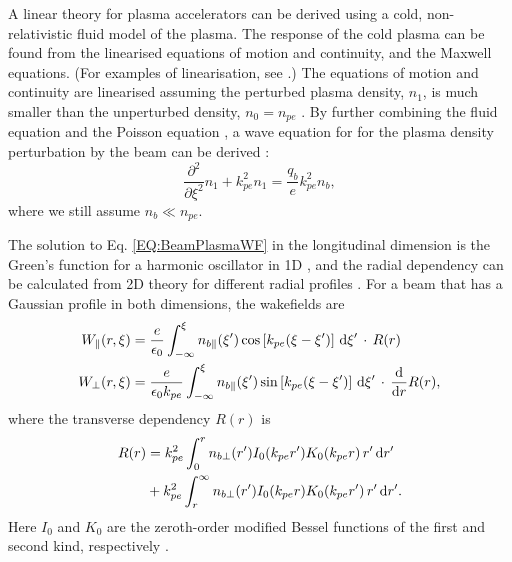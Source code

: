 A linear theory for plasma accelerators can be derived using a cold, non-relativistic fluid model of the plasma. The response of the cold plasma can be found from the linearised equations of motion and continuity, and the Maxwell equations. (For examples of linearisation, see \cite{pecseli:2012,chen:1974}.) The equations of motion and continuity are linearised assuming the perturbed plasma density, $n_{1}$, is much smaller than the unperturbed density, $n_{0} = n_{pe}$ \cite{chen:1987}. By further combining the fluid equation and the Poisson equation \cite{katsouleas:1987}, a wave equation for for the plasma density perturbation by the beam can be derived \cite{chen:1987,muggli:2017}:
\begin{equation}
    \frac{\partial^{2}}{\partial\xi^{2}}n_{1} + k_{pe}^{2}n_{1} = \frac{q_{b}}{e}k_{pe}^{2}n_{b}, \label{EQ:BeamPlasmaWF}
\end{equation}
where we still assume $n_{b} \ll n_{pe}$.

The solution to Eq. \ref{EQ:BeamPlasmaWF} in the longitudinal dimension is the Green’s function for a harmonic oscillator in 1D \cite{katsouleas:1987}, and the radial dependency can be calculated from 2D theory for different radial profiles \cite{chen:1987}. For a beam that has a Gaussian profile in both dimensions, the wakefields are
\begin{align}
    W_{\parallel}(r,\xi) &= \frac{e}{\epsilon_{0}}
        \int_{-\infty}^{\xi} n_{b\parallel}(\xi^{\prime}) \cos\left[k_{pe}(\xi-\xi^{\prime})\right] \,\mathrm{d}\xi^{\prime} \,\cdot\, R(r) \label{EQ:WzFull} \\
    W_{\perp}(r,\xi) &= \frac{e}{\epsilon_{0}k_{pe}}
        \int_{-\infty}^{\xi} n_{b\parallel}(\xi^{\prime}) \sin\left[k_{pe}(\xi-\xi^{\prime})\right] \,\mathrm{d}\xi^{\prime} \,\cdot\, \frac{\mathrm{d}}{\mathrm{d}r}R(r), \label{EQ:WrFull}
\end{align}
where the transverse dependency $R(r)$ is
\begin{align}
    R(r) &= k_{pe}^{2} \int_{0}^{r} n_{b\perp}(r^{\prime}) I_{0}(k_{pe}r^{\prime})
           K_{0}(k_{pe}r) \,r^{\prime}\,\mathrm{d} r^{\prime} \nonumber \\
         &+ k_{pe}^{2} \int_{r}^{\infty} n_{b\perp}(r^{\prime}) I_{0}(k_{pe}r)
           K_{0}(k_{pe}r^{\prime}) \,r^{\prime}\,\mathrm{d} r^{\prime}. \label{EQ:WFRadial}
\end{align}
Here $I_{0}$ and $K_{0}$ are the zeroth-order modified Bessel functions of the first and second kind, respectively \cite{chen:1987,muggli:2017}.

